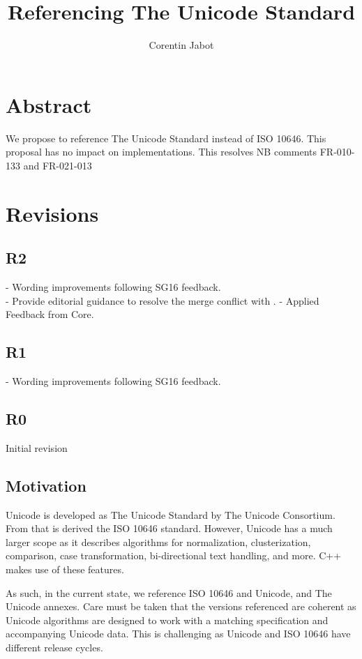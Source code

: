 \documentclass{wg21}
\title{Referencing The Unicode Standard}
\author{Corentin Jabot}{corentin.jabot@gmail.com}
\begin{document}
\maketitle

\section{Abstract}

We propose to reference The Unicode Standard instead of ISO 10646.
This proposal has no impact on implementations.
This resolves NB comments FR-010-133 and FR-021-013


\section{Revisions}

\subsection{R2}

- Wording improvements following SG16 feedback.\\
- Provide editorial guidance to resolve the merge conflict with .
- Applied Feedback from Core.

\subsection{R1}

- Wording improvements following SG16 feedback.

\subsection{R0}

Initial revision

\subsection{Motivation}

Unicode is developed as The Unicode Standard by The Unicode Consortium.
From that is derived the ISO 10646 standard.
However, Unicode has a much larger scope as it describes algorithms for normalization,
clusterization, comparison, case transformation, bi-directional text handling, and more.
C++ makes use of these features.

As such, in the current state, we reference ISO 10646 and Unicode, and The Unicode annexes.
Care must be taken that the versions referenced are coherent as Unicode algorithms
are designed to work with a matching specification and accompanying Unicode data.
This is challenging as Unicode and ISO 10646 have different release cycles.
\end{document}
